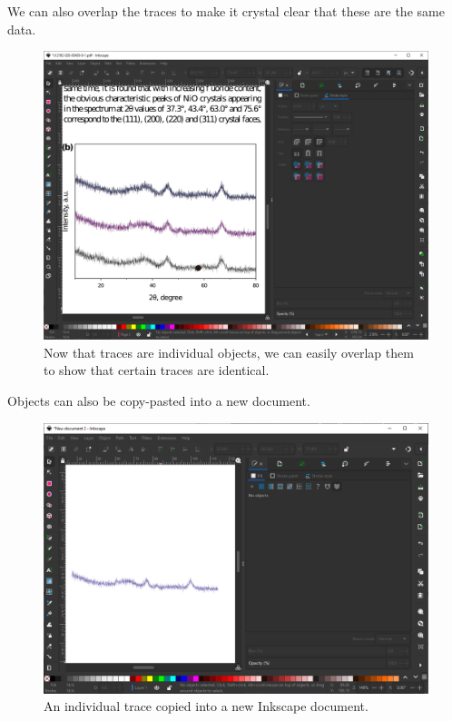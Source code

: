 \documentclass[letterpaper, 12pt]{article}
\begin{document}
\pagebreak
We can also overlap the traces to make it crystal clear that these are the same data.

\begin{figure}[h!tbp]
    \includegraphics[width=\textwidth]{img/vector/in_inkscape_individual_traces_thinned_overlapping.PNG}
    \caption*{Now that traces are individual objects, we can easily overlap them to show that certain traces are identical.}
\end{figure}

\pagebreak
Objects can also be copy-pasted into a new document.

\begin{figure}[h!tbp]
    \includegraphics[width=\textwidth]{img/vector/inkscape_new_document.PNG}
    \caption*{ An individual trace copied into a new Inkscape document.}
\end{figure}
\end{document}
